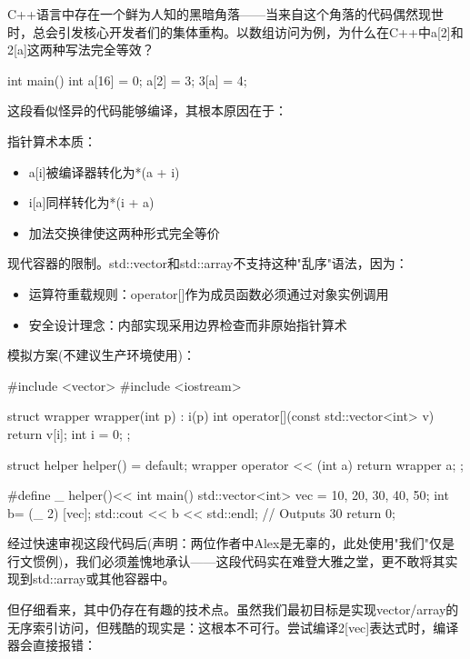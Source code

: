 C++语言中存在一个鲜为人知的黑暗角落——当来自这个角落的代码偶然现世时，总会引发核心开发者们的集体重构。以数组访问为例，为什么在C++中a[2]和2[a]这两种写法完全等效？

\begin{cpp}
int main() {
  int a[16] = {0};
  a[2] = 3;
  3[a] = 4;
}
\end{cpp}

这段看似怪异的代码能够编译，其根本原因在于：


指针算术本质：

\begin{itemize}
\item 
a[i]被编译器转化为*(a + i)

\item 
i[a]同样转化为*(i + a)

\item 
加法交换律使这两种形式完全等价
\end{itemize}

现代容器的限制。std::vector和std::array不支持这种"乱序"语法，因为：

\begin{itemize}
\item 
运算符重载规则：operator[]作为成员函数必须通过对象实例调用

\item 
安全设计理念：内部实现采用边界检查而非原始指针算术
\end{itemize}

模拟方案(不建议生产环境使用)：

\begin{cpp}
#include <vector>
#include <iostream>

struct wrapper {
  wrapper(int p) : i(p) {}
  int operator[](const std::vector<int> v) {return v[i];}
  int i = 0;
};

struct helper {
  helper() = default;
  wrapper operator << (int a) { return wrapper {a}; }
};

#define _ helper()<<
int main() {
  std::vector<int> vec = {10, 20, 30, 40, 50};
  int b= (_ 2) [vec];
  std::cout << b << std::endl; // Outputs 30
  return 0;
}
\end{cpp}

经过快速审视这段代码后(声明：两位作者中Alex是无辜的，此处使用"我们"仅是行文惯例)，我们必须羞愧地承认——这段代码实在难登大雅之堂，更不敢将其实现到std::array或其他容器中。

但仔细看来，其中仍存在有趣的技术点。虽然我们最初目标是实现vector/array的无序索引访问，但残酷的现实是：这根本不可行。尝试编译2[vec]表达式时，编译器会直接报错：


